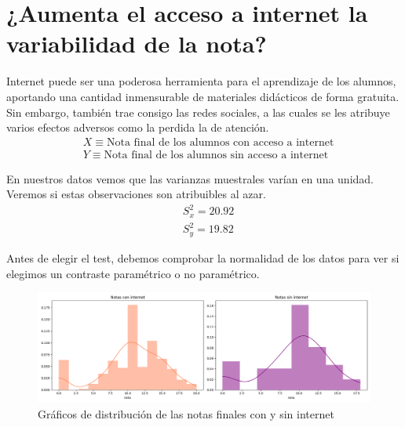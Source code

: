 \section{¿Aumenta el acceso a internet la variabilidad de la nota?}

Internet puede ser una poderosa herramienta para el aprendizaje de los alumnos, aportando una cantidad inmensurable de materiales didácticos de forma gratuita. Sin embargo, también trae consigo las redes sociales, a las cuales se les atribuye varios efectos adversos como la perdida la de atención.
\begin{equation*}
    \begin{split}
        & X \equiv \text{Nota final de los alumnos con acceso a internet}\\
        & Y \equiv \text{Nota final de los alumnos sin acceso a internet}
    \end{split}
\end{equation*}
    
En nuestros datos vemos que las varianzas muestrales varían en una unidad. Veremos si estas observaciones son atribuibles al azar.
\begin{equation*}
    \begin{split}
        & S_x^2 = 20.92\\
        & S_{y}^2 = 19.82
    \end{split}
\end{equation*}

Antes de elegir el test, debemos comprobar la normalidad de los datos para ver si elegimos un contraste paramétrico o no paramétrico.

\begin{figure}[H]
    \begin{center}
        \includegraphics[width=1\textwidth]{figures/dist-notas-internet.png}
    \end{center}
    \caption{Gráficos de distribución de las notas finales con y sin internet}\label{fig:dist-notas-internet}
\end{figure}


